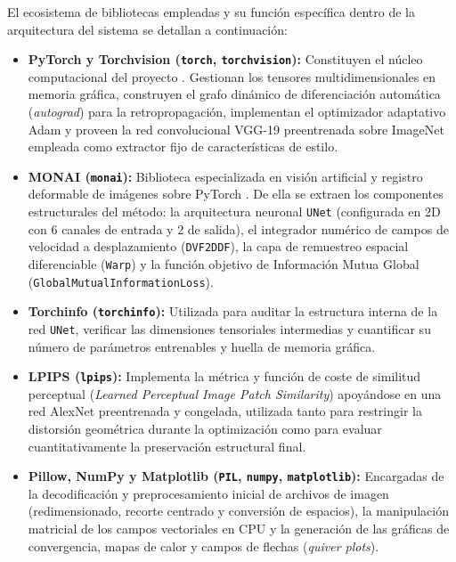 \documentclass[a4paper]{article}
\begin{document}
\vspace{0.3cm}

\noindent El ecosistema de bibliotecas empleadas y su función específica dentro de la arquitectura del sistema se detallan a continuación:

\begin{itemize}
    \item \textbf{PyTorch y Torchvision (\texttt{torch}, \texttt{torchvision}):} Constituyen el núcleo computacional del proyecto \cite{paszke2019pytorch}. Gestionan los tensores multidimensionales en memoria gráfica, construyen el grafo dinámico de diferenciación automática (\textit{autograd}) para la retropropagación, implementan el optimizador adaptativo Adam \cite{kingma2015adam} y proveen la red convolucional VGG-19 \cite{simonyan2015very} preentrenada sobre ImageNet \cite{deng2009imagenet} empleada como extractor fijo de características de estilo.
    
    \item \textbf{MONAI (\texttt{monai}):} Biblioteca especializada en visión artificial y registro deformable de imágenes sobre PyTorch \cite{cardoso2022monai}. De ella se extraen los componentes estructurales del método: la arquitectura neuronal \texttt{UNet} \cite{ronneberger2015unet} (configurada en 2D con $6$ canales de entrada y $2$ de salida), el integrador numérico de campos de velocidad a desplazamiento (\texttt{DVF2DDF}), la capa de remuestreo espacial diferenciable (\texttt{Warp}) y la función objetivo de Información Mutua Global (\texttt{GlobalMutualInformationLoss}).
    
    \item \textbf{Torchinfo (\texttt{torchinfo}):} Utilizada para auditar la estructura interna de la red \texttt{UNet}, verificar las dimensiones tensoriales intermedias y cuantificar su número de parámetros entrenables y huella de memoria gráfica.

    \item \textbf{LPIPS (\texttt{lpips}):} Implementa la métrica y función de coste de similitud perceptual (\textit{Learned Perceptual Image Patch Similarity}) \cite{zhang2018unreasonable} apoyándose en una red AlexNet \cite{krizhevsky2012imagenet} preentrenada y congelada, utilizada tanto para restringir la distorsión geométrica durante la optimización como para evaluar cuantitativamente la preservación estructural final.
    
    \item \textbf{Pillow, NumPy y Matplotlib (\texttt{PIL}, \texttt{numpy}, \texttt{matplotlib}):} Encargadas de la decodificación y preprocesamiento inicial de archivos de imagen (redimensionado, recorte centrado y conversión de espacios), la manipulación matricial de los campos vectoriales en CPU y la generación de las gráficas de convergencia, mapas de calor y campos de flechas (\textit{quiver plots}).


\end{itemize}
\end{document}
